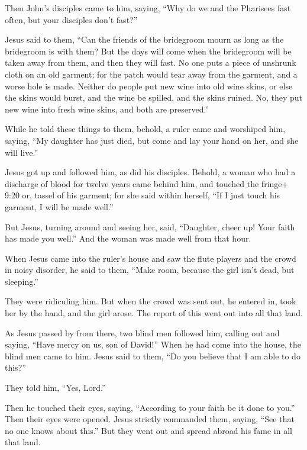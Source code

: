  Then John's disciples came to him, saying, ``Why do we and
the Pharisees fast often, but your disciples don't fast?''

 Jesus said to them, ``Can the friends of the bridegroom
mourn as long as the bridegroom is with them? But the days will come
when the bridegroom will be taken away from them, and then they will
fast.  No one puts a piece of unshrunk cloth on an old
garment; for the patch would tear away from the garment, and a worse
hole is made.  Neither do people put new wine into old wine
skins, or else the skins would burst, and the wine be spilled, and the
skins ruined. No, they put new wine into fresh wine skins, and both are
preserved.''

 While he told these things to them, behold, a ruler came
and worshiped him, saying, ``My daughter has just died, but come and lay
your hand on her, and she will live.''

 Jesus got up and followed him, as did his disciples.
 Behold, a woman who had a discharge of blood for twelve
years came behind him, and touched the fringe+ 9:20 or, tassel of his
garment;  for she said within herself, ``If I just touch
his garment, I will be made well.''

 But Jesus, turning around and seeing her, said,
``Daughter, cheer up! Your faith has made you well.'' And the woman was
made well from that hour.

 When Jesus came into the ruler's house and saw the flute
players and the crowd in noisy disorder,  he said to them,
``Make room, because the girl isn't dead, but sleeping.''

They were ridiculing him.  But when the crowd was sent out,
he entered in, took her by the hand, and the girl arose. 
The report of this went out into all that land.

 As Jesus passed by from there, two blind men followed him,
calling out and saying, ``Have mercy on us, son of David!''
 When he had come into the house, the blind men came to
him. Jesus said to them, ``Do you believe that I am able to do this?''

They told him, ``Yes, Lord.''

 Then he touched their eyes, saying, ``According to your
faith be it done to you.''  Then their eyes were opened.
Jesus strictly commanded them, saying, ``See that no one knows about
this.''  But they went out and spread abroad his fame in
all that land.

